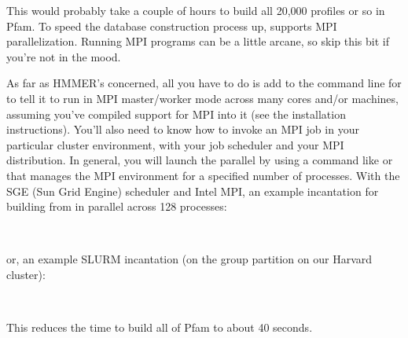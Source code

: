    \vspace{1ex}
   \vspace{1ex}

This would probably take a couple of hours to build all 20,000 profiles
or so in Pfam. To speed the database construction process up,
 supports MPI parallelization. Running MPI programs can
be a little arcane, so skip this bit if you're not in the mood.

As far as HMMER's concerned, all you have to do is add 
to the command line for  to tell it to run in MPI
master/worker mode across many cores and/or machines, assuming you've
compiled support for MPI into it (see the installation instructions).
You'll also need to know how to invoke an MPI job in your particular
cluster environment, with your job scheduler and your MPI
distribution. In general, you will launch the parallel
 by using a command like  or 
that manages the MPI environment for a specified number of processes.
With the SGE (Sun Grid Engine) scheduler and Intel MPI, an example
incantation for building  from  in
parallel across 128 processes:

   \vspace{1ex}
   \\
   \vspace{1ex}

or, an example SLURM incantation (on the  group partition
on our Harvard cluster):

   \vspace{1ex}
   \begin{fullwidth}
   \\
   \end{fullwidth}
   \vspace{1em}

This reduces the time to build all of Pfam to about 40 seconds.



